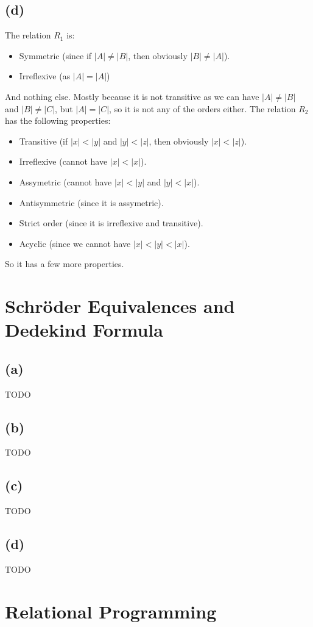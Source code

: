 \documentclass[a4paper, fleqn]{article}
\begin{document}
\subsection{(d)}
The relation $R_1$ is:
\begin{itemize}
  \item Symmetric (since if $|A|\neq |B|$, then obviously $|B|\neq|A|$).
  \item Irreflexive (as $|A| = |A|$)
\end{itemize}
And nothing else. Mostly because it is not transitive as we can have $|A|\neq |B|$ and
$|B|\neq |C|$, but $|A|=|C|$, so it is not any of the orders either. The relation $R_2$ has the
following properties:
\begin{itemize}
  \item Transitive (if $|x|<|y|$ and $|y|<|z|$, then obviously $|x|<|z|$).
  \item Irreflexive (cannot have $|x|<|x|$).
  \item Assymetric (cannot have $|x|<|y|$ and $|y|<|x|$).
  \item Antisymmetric (since it is assymetric).
  \item Strict order (since it is irreflexive and transitive).
  \item Acyclic (since we cannot have $|x|<|y|<|x|$).
\end{itemize}
So it has a few more properties.

\section{Schröder Equivalences and Dedekind Formula}
\subsection{(a)}
TODO

\subsection{(b)}
TODO

\subsection{(c)}
TODO

\subsection{(d)}
TODO

\section{Relational Programming}
\end{document}
